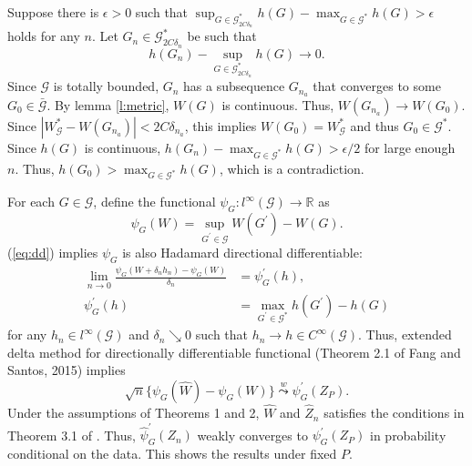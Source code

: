 \documentclass[12pt,oneside,reqno,english]{amsart}
\theoremstyle{definition}
\begin{document}
Suppose there is $\epsilon>0$ such that 
$\sup_{G\in \mathcal{G}^{*}_{2C\delta_{n}}}h(G)-\max_{G\in \mathcal{G}^{*}}h(G)>\epsilon$ holds for any $n$. 
Let $G_{n}\in \mathcal{G}^{*}_{2C\delta_{n}}$ be such that 
\[h(G_{n})-\sup_{G\in \mathcal{G}^{*}_{2C\delta_{n}}}h(G)\rightarrow 0.\]
Since $\mathcal{G}$ is totally bounded, $G_{n}$ has a subsequence $G_{n_{a}}$ that converges to some $G_{0}\in \bar{\mathcal{G}}$. 
By lemma \ref{l:metric}, $W(G)$ is continuous. Thus, $W(G_{n_{a}}) \rightarrow W(G_{0})$. Since $|W^{*}_{\mathcal{G}}-W(G_{n_{a}})|< 2C\delta_{n_{a}}$,
this implies $W(G_{0})=W^{*}_{\mathcal{G}}$ and thus
 $G_{0}\in \mathcal{G}^{*}$.   
Since $h(G)$ is continuous, $h(G_{n})-\max_{G\in \mathcal{G}^{*}}h(G)>\epsilon/2$ for large enough $n$. 
Thus, $h(G_{0})> \max_{G\in \mathcal{G}^{*}}h(G)$, which is a contradiction. 

For each $G\in \mathcal{G}$, define the functional $\psi_{G}:l^{\infty}(\mathcal{G})\rightarrow \mathbb{R}$ as 
\[\psi_{G}(W)=\sup_{G^{\prime}\in \mathcal{G}}W(G^{\prime})-W(G).\]
(\ref{eq:dd}) implies $\psi_{G}$ is also Hadamard directional differentiable:
\begin{align*}
\lim_{n\rightarrow 0}\frac{\psi_{G}(W+\delta_{n}h_{n})-\psi_{G}(W)}{\delta_{n}}&=\psi_{G}^{\prime}(h),\\
\psi_{G}^{\prime}(h)&=\max_{G^{\prime}\in \mathcal{G}^{*}}h(G^{\prime})-h(G)
\end{align*}
for any $h_{n}\in l^{\infty}(\mathcal{G})$ and $\delta_{n}\searrow 0$ such that $h_{n}\rightarrow h\in C^{\infty}(\mathcal{G})$. 
Thus, extended delta method for directionally differentiable functional (Theorem 2.1 of Fang and Santos, 2015) implies 
\[\sqrt{n}\{\psi_{G}(\hat{W})-\psi_{G}(W)\}\overset{w}{\underset{}{\leadsto}}\psi^{\prime}_{G}(Z_{P}).\]
Under the assumptions of Theorems 1 and 2, $\hat{W}$ and $\hat{Z}_{n}$ satisfies the conditions in Theorem 3.1 of \cite{HL:18}. Thus, 
$\hat{\psi}^{\prime}_{G}(Z_{n})$ weakly converges to $\psi^{\prime}_{G}(Z_{P})$ in probability conditional on the data. This shows the results under 
fixed $P$. 
\end{document}
